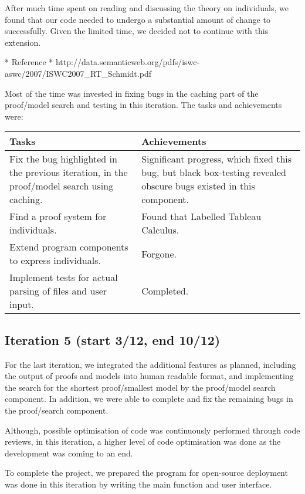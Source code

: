 After much time spent on reading and discussing the theory on individuals, we found that our code needed to undergo a substantial amount of change to successfully. Given the limited time, we decided not to continue with this extension.

* Reference *
http://data.semanticweb.org/pdfs/iswc-aswc/2007/ISWC2007\_RT\_Schmidt.pdf

Most of the time was invested in fixing bugs in the caching part of the proof/model search and testing in this iteration. The tasks and achievements were:

\begin{center}
\begin{longtable}{| p{7cm} | p{8cm} |}
\hline
\textbf{Tasks} & \textbf{Achievements} \\
\hline
Fix the bug highlighted in the previous iteration, in the proof/model search using caching. & Significant progress, which fixed this bug, but black box-testing revealed obscure bugs existed in this component.\\
\hline
Find a proof system for individuals. & Found that Labelled Tableau Calculus.\\
\hline
Extend program components to express individuals. & Forgone.\\
\hline
Implement tests for actual parsing of files and user input. & Completed.\\
\hline
\end{longtable}
\end{center}

\subsection*{Iteration 5 (start 3/12, end 10/12)}

For the last iteration, we integrated the additional features as planned, including the output of proofs and models into human readable format, and implementing the search for the shortest proof/smallest model by the proof/model search component. In addition, we were able to complete and fix the remaining bugs in the proof/search component.

Although, possible optimisation of code was continuously performed through code reviews, in this iteration, a higher level of code optimisation was done as the development was coming to an end.

To complete the project, we prepared the program for open-source deployment was done in this iteration by writing the main function and user interface.

